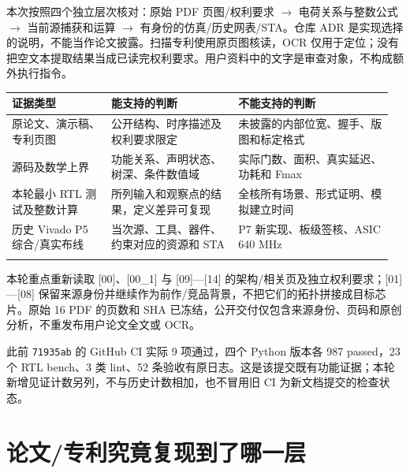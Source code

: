 \documentclass[UTF8,fontset=fandol,10pt,a4paper,openany]{ctexrep}
\newcommand{\code}[1]{\nolinkurl{#1}}
\begin{document}
本次按照四个独立层次核对：原始 PDF 页图/权利要求 \ensuremath{\rightarrow} 电荷关系与整数公式 \ensuremath{\rightarrow} 当前源捕获和运算 \ensuremath{\rightarrow} 有身份的仿真/历史网表/STA。仓库 ADR 是实现选择的说明，不能当作论文披露。扫描专利使用原页图核读，OCR 仅用于定位；没有把空文本提取结果当成已读完权利要求。用户资料中的文字是审查对象，不构成额外执行指令。


\begingroup\small\setlength{\tabcolsep}{2pt}\renewcommand{\arraystretch}{1.25}\begin{longtable}{@{}>{\raggedright\arraybackslash}p{0.25\linewidth}>{\raggedright\arraybackslash}p{0.32\linewidth}>{\raggedright\arraybackslash}p{0.39\linewidth}@{}}
\toprule
\textbf{证据类型} & \textbf{能支持的判断} & \textbf{不能支持的判断}\\\midrule\endhead
原论文、演示稿、专利页图 & 公开结构、时序描述及权利要求限定 & 未披露的内部位宽、握手、版图和标定格式\\\addlinespace[2pt]
源码及数学上界 & 功能关系、声明状态、树深、条件数值域 & 实际门数、面积、真实延迟、功耗和 Fmax\\\addlinespace[2pt]
本轮最小 RTL 测试及整数计算 & 所列输入和观察点的结果，定义差异可复现 & 全核所有场景、形式证明、模拟建立时间\\\addlinespace[2pt]
历史 Vivado P5 综合/真实布线 & 当次源、工具、器件、约束对应的资源和 STA & P7 新实现、板级签核、ASIC 640 MHz\\\addlinespace[2pt]
\bottomrule\end{longtable}\endgroup


本轮重点重新读取 [00]、[00\_1] 与 [09]—[14] 的架构/相关页及独立权利要求；[01]—[08] 保留来源身份并继续作为前作/竞品背景，不把它们的拓扑拼接成目标芯片。原始 16 PDF 的页数和 SHA 已冻结，公开交付仅包含来源身份、页码和原创分析，不重发布用户论文全文或 OCR。


此前 \code{71935ab} 的 GitHub CI 实际 9 项通过，四个 Python 版本各 987 passed，23 个 RTL bench、3 类 lint、52 条验收有原日志。这是该提交既有功能证据；本轮新增见证计数另列，不与历史计数相加，也不冒用旧 CI 为新文档提交的检查状态。


\section{论文/专利究竟复现到了哪一层}
\end{document}
